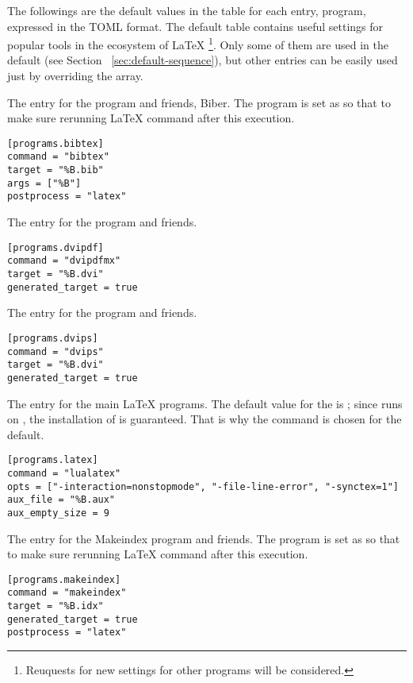 \documentclass[draft]{llmk-doc}
\begin{document}
The followings are the default values in the  table for each
entry, \ie program, expressed in the TOML format. The default 
table contains useful settings for popular tools in the ecosystem of {\LaTeX}%
\footnote{Reuquests for new settings for other programs will be considered.}.
Only some of them are used in the default  (see Section~%
\ref{sec:default-sequence}), but other entries can be easily used just by
overriding the  array.

 The entry for the {\BibTeX} program and friends, \eg Biber.
The  program is set as  so that to make sure
rerunning {\LaTeX} command after this execution.
%
\begin{lstlisting}[style=toml]
[programs.bibtex]
command = "bibtex"
target = "%B.bib"
args = ["%B"]
postprocess = "latex"
\end{lstlisting}

 The entry for the  program and friends.
%
\begin{lstlisting}[style=toml]
[programs.dvipdf]
command = "dvipdfmx"
target = "%B.dvi"
generated_target = true
\end{lstlisting}

 The entry for the  program and friends.
%
\begin{lstlisting}[style=toml]
[programs.dvips]
command = "dvips"
target = "%B.dvi"
generated_target = true
\end{lstlisting}

 The entry for the main {\LaTeX} programs. The default value for
the  is ; since  runs on
, the installation of {\LuaTeX} is guaranteed. That is why the
command is chosen for the default.
%
\begin{lstlisting}[style=toml]
[programs.latex]
command = "lualatex"
opts = ["-interaction=nonstopmode", "-file-line-error", "-synctex=1"]
aux_file = "%B.aux"
aux_empty_size = 9
\end{lstlisting}

 The entry for the Makeindex program and friends. The
 program is set as  so that to make sure
rerunning {\LaTeX} command after this execution.
%
\begin{lstlisting}[style=toml]
[programs.makeindex]
command = "makeindex"
target = "%B.idx"
generated_target = true
postprocess = "latex"
\end{lstlisting}
\end{document}
